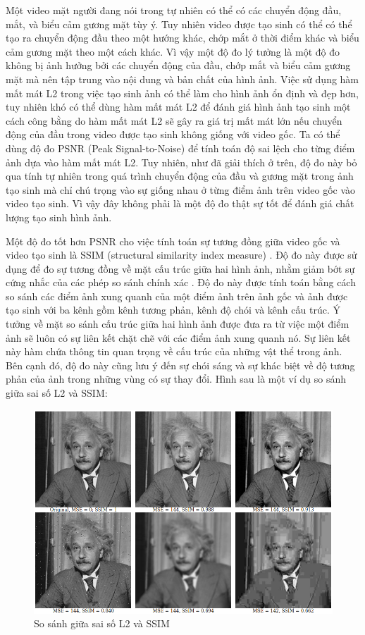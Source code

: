 Một video mặt người đang nói trong tự nhiên có thể có các chuyển động đầu, mắt, và biểu cảm gương mặt tùy ý. Tuy nhiên video được tạo sinh có thể có thể tạo ra chuyển động đầu theo một hướng khác, chớp mắt ở thời điểm khác và biểu cảm gương mặt theo một cách khác. Vì vậy một độ đo lý tưởng là một độ đo không bị ảnh hưởng bởi các chuyển động của đầu, chớp mắt và biểu cảm gương mặt mà nên tập trung vào nội dung và bản chất của hình ảnh. Việc sử dụng hàm mất mát L2 trong việc tạo sinh ảnh có thể làm cho hình ảnh ổn định và đẹp hơn, tuy nhiên khó có thể dùng hàm mất mát L2 để đánh giá hình ảnh tạo sinh một cách công bằng do hàm mất mát L2 sẽ gây ra giá trị mất mát lớn nếu chuyển động của đầu trong video được tạo sinh không giống với video gốc. Ta có thể dùng độ đo PSNR (Peak Signal-to-Noise) để tính toán độ sai lệch cho từng điểm ảnh dựa vào hàm mất mát L2. Tuy nhiên, như đã giải thích ở trên, độ đo này bỏ qua tính tự nhiên trong quá trình chuyển động của đầu và gương mặt trong ảnh tạo sinh mà chỉ chú trọng vào sự giống nhau ở từng điểm ảnh trên video gốc vào video tạo sinh. Vì vậy đây không phải là một độ đo thật sự tốt để đánh giá chất lượng tạo sinh hình ảnh.

Một độ đo tốt hơn PSNR cho việc tính toán sự tương đồng giữa video gốc và video tạo sinh là SSIM (structural similarity index measure) \cite{ssim}. Độ đo này được sử dụng để đo sự tương đồng về mặt cấu trúc giữa hai hình ảnh, nhằm giảm bớt sự cứng nhắc của các phép so sánh chính xác \cite{psrn_ssim}. Độ đo này được tính toán bằng cách so sánh các điểm ảnh xung quanh của một điểm ảnh trên ảnh gốc và ảnh được tạo sinh với ba kênh gồm kênh tương phản, kênh độ chói và kênh cấu trúc. Ý tưởng về mặt so sánh cấu trúc giữa hai hình ảnh được đưa ra từ việc một điểm ảnh sẽ luôn có sự liên kết chặt chẽ với các điểm ảnh xung quanh nó. Sự liên kết này hàm chứa thông tin quan trọng về cấu trúc của những vật thể trong ảnh. Bên cạnh đó, độ đo này cũng lưu ý đến sự chói sáng và sự khác biệt về độ tương phản của ảnh trong những vùng có sự thay đổi. Hình sau là một ví dụ so sánh giữa sai số L2 và SSIM:

\begin{figure}[H]
    \centering
    \includegraphics[width=15cm]{./content/materials/l2_ssim.png}
    \caption{So sánh giữa sai số L2 và SSIM}
\end{figure}

